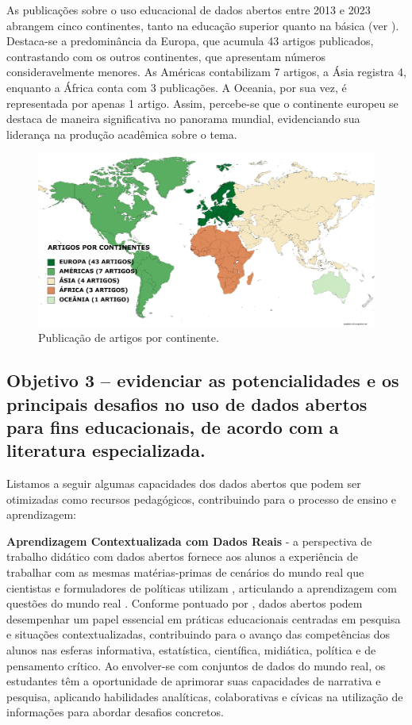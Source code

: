 \documentclass[portuguese]{textolivre}
\begin{document}
As publicações sobre o uso educacional de dados abertos entre 2013 e 2023 abrangem cinco continentes, tanto na educação superior quanto na básica (ver ). Destaca-se a predominância da Europa, que acumula 43 artigos publicados, contrastando com os outros continentes, que apresentam números consideravelmente menores. As Américas contabilizam 7 artigos, a Ásia registra 4, enquanto a África conta com 3 publicações. A Oceania, por sua vez, é representada por apenas 1 artigo. Assim, percebe-se que o continente europeu se destaca de maneira significativa no panorama mundial, evidenciando sua liderança na produção acadêmica sobre o tema.

\begin{figure}[h]
\centering
\begin{minipage}{0.75\linewidth}
\includegraphics[width=\linewidth]{Fig6.png}
\caption{Publicação de artigos por continente.}
\label{fig6}
\end{minipage}
\end{figure}

\subsection{Objetivo 3 – evidenciar as potencialidades e os principais desafios no uso de dados abertos para fins educacionais, de acordo com a literatura especializada.}  
Listamos a seguir algumas capacidades dos dados abertos que podem ser otimizadas como recursos pedagógicos, contribuindo para o processo de ensino e aprendizagem:

\textbf{Aprendizagem Contextualizada com Dados Reais} - a perspectiva de trabalho didático com dados abertos fornece aos alunos a experiência de trabalhar com as mesmas matérias-primas de cenários do mundo real que cientistas e formuladores de políticas utilizam \cite{atenas2015,kukulska-hulme2020}, articulando a aprendizagem com questões do mundo real \cite{kasl1997,barron1998,hmelo2004,davies2010}. Conforme pontuado por \textcite{atenas2015}, dados abertos podem desempenhar um papel essencial em práticas educacionais centradas em pesquisa e situações contextualizadas, contribuindo para o avanço das competências dos alunos nas esferas informativa, estatística, científica, midiática, política e de pensamento crítico. Ao envolver-se com conjuntos de dados do mundo real, os estudantes têm a oportunidade de aprimorar suas capacidades de narrativa e pesquisa, aplicando habilidades analíticas, colaborativas e cívicas na utilização de informações para abordar desafios concretos.
\end{document}
